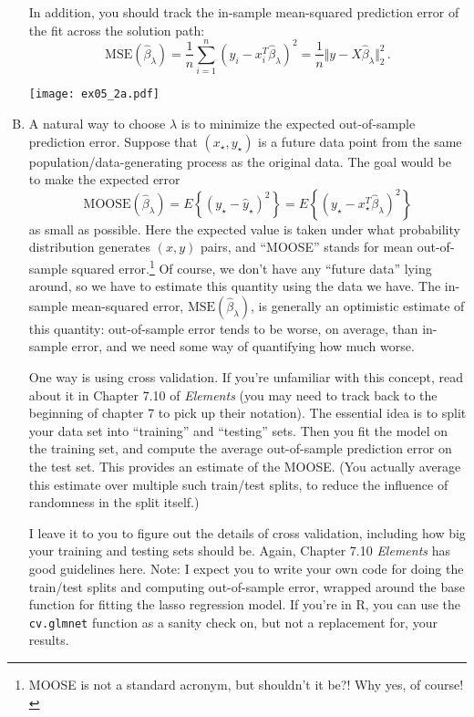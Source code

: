 \documentclass{article}
\begin{document}
\begin{enumerate}[(A)]
In addition, you should track the in-sample mean-squared prediction error of the fit across the solution path:
$$
\mathrm{MSE}(\hat \beta_{\lambda}) = \frac{1}{n} \sum_{i=1}^n (y_i - x_i^T \hat \beta_{\lambda})^2 = \frac{1}{n} \Vert y - X \hat \beta_{\lambda} \Vert_2^2 \, .
$$

\color{blue}
\begin{center}
\texttt{[image: ex05\_2a.pdf]}
\end{center}
\color{black}

\item A natural way to choose $\lambda$ is to minimize the expected out-of-sample prediction error.  Suppose that $(x_{\star}, y_{\star})$ is a future data point from the same population/data-generating process as the original data.  The goal would be to make the expected error
$$
\mathrm{MOOSE}(\hat{\beta}_{\lambda}) =  E \left\{ (y_{\star} - \hat{y}_{\star} )^2 \right\} = E \left\{ (y_{\star} - x_\star^T \hat{\beta}_{\lambda} )^2 \right\} 
$$
as small as possible.  Here the expected value is taken under what probability distribution generates $(x,y)$ pairs, and ``MOOSE'' stands for mean out-of-sample squared error.\footnote{MOOSE is not a standard acronym, but shouldn't it be?! \color{blue} Why yes, of course! \color{black}}  Of course, we don't have any ``future data'' lying around, so we have to estimate this quantity using the data we have.  The in-sample mean-squared error, $\mathrm{MSE}(\hat \beta_{\lambda})$, is generally an optimistic estimate of this quantity: out-of-sample error tends to be worse, on average, than in-sample error, and we need some way of quantifying how much worse.

One way is using cross validation.  If you're unfamiliar with this concept, read about it in Chapter 7.10 of \textit{Elements} (you may need to track back to the beginning of chapter 7 to pick up their notation).  The essential idea is to split your data set into ``training'' and ``testing'' sets.  Then you fit the model on the training set, and compute the average out-of-sample prediction error on the test set.  This provides an estimate of the MOOSE.  (You actually average this estimate over multiple such train/test splits, to reduce the influence of randomness in the split itself.)

I leave it to you to figure out the details of cross validation, including how big your training and testing sets should be.  Again, Chapter 7.10 \textit{Elements} has good guidelines here.  Note: I expect you to write your own code for doing the train/test splits and computing out-of-sample error, wrapped around the base function for fitting the lasso regression model.   If you're in R, you can use the \verb|cv.glmnet| function as a sanity check on, but not a replacement for, your results.


\end{enumerate}
\end{document}
